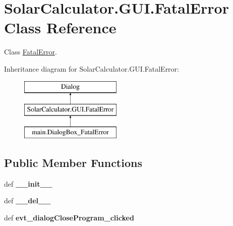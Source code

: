 \hypertarget{class_solar_calculator_1_1_g_u_i_1_1_fatal_error}{\section{Solar\-Calculator.\-G\-U\-I.\-Fatal\-Error Class Reference}
\label{class_solar_calculator_1_1_g_u_i_1_1_fatal_error}
}


Class \hyperlink{class_solar_calculator_1_1_g_u_i_1_1_fatal_error}{Fatal\-Error}.  


Inheritance diagram for Solar\-Calculator.\-G\-U\-I.\-Fatal\-Error\-:\begin{figure}[H]
\begin{center}
\leavevmode
\includegraphics[height=3.000000cm]{class_solar_calculator_1_1_g_u_i_1_1_fatal_error}
\end{center}
\end{figure}
\subsection*{Public Member Functions}
\begin{DoxyCompactItemize}
\item 
\hypertarget{class_solar_calculator_1_1_g_u_i_1_1_fatal_error_a0a5b37abd18cdb5cfa16d25124311fc9}{def {\bfseries \-\_\-\-\_\-init\-\_\-\-\_\-}}\label{class_solar_calculator_1_1_g_u_i_1_1_fatal_error_a0a5b37abd18cdb5cfa16d25124311fc9}

\item 
\hypertarget{class_solar_calculator_1_1_g_u_i_1_1_fatal_error_ab55549d6697f978310f12d93aa6483a4}{def {\bfseries \-\_\-\-\_\-del\-\_\-\-\_\-}}\label{class_solar_calculator_1_1_g_u_i_1_1_fatal_error_ab55549d6697f978310f12d93aa6483a4}

\item 
\hypertarget{class_solar_calculator_1_1_g_u_i_1_1_fatal_error_a2e42424e12218f036c939425649996c5}{def {\bfseries evt\-\_\-dialog\-Close\-Program\-\_\-clicked}}\label{class_solar_calculator_1_1_g_u_i_1_1_fatal_error_a2e42424e12218f036c939425649996c5}

\end{DoxyCompactItemize}
